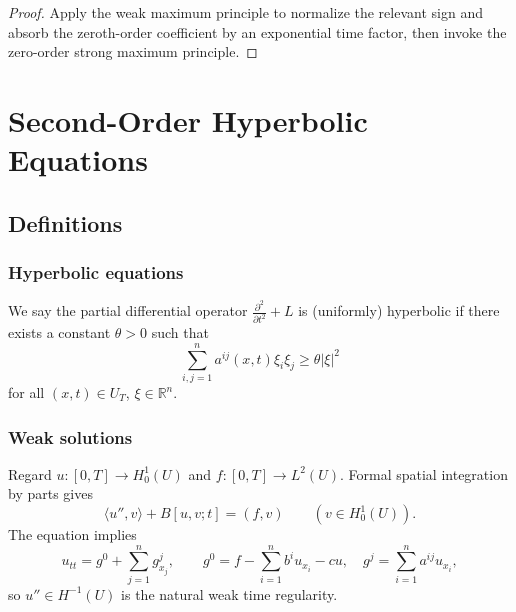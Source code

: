 \begin{proof}
\sketch Apply the weak maximum principle to normalize the relevant sign and absorb the zeroth-order coefficient by an exponential time factor, then invoke the zero-order strong maximum principle.
\end{proof}

\section{Second-Order Hyperbolic Equations}
\label{sec:second-order-hyperbolic-equations}

\subsection{Definitions}

\subsubsection{Hyperbolic equations}

\begin{definition}
\label{def:uniform-hyperbolicity}
We say the partial differential operator $\frac{\partial^2}{\partial t^2} + L$ is (uniformly) hyperbolic if there exists a constant $\theta > 0$ such that
\[
\sum_{i,j=1}^{n} a^{ij}(x,t)\xi_i\xi_j \geq \theta|\xi|^2
\tag{4}
\]
for all $(x,t) \in U_T$, $\xi \in \mathbb{R}^n$.
\end{definition}

\subsubsection{Weak solutions}

\begin{remark}
\label{rem:motivation-weak-solution-hyperbolic}

Regard $u:[0,T]\to H_0^1(U)$ and $f:[0,T]\to L^2(U)$. Formal spatial integration by parts gives
\[
\langle u'',v\rangle+B[u,v;t]=(f,v) \qquad (v\in H_0^1(U)).
\tag{9}
\]
The equation implies
\[
u_{tt}=g^0+\sum_{j=1}^n g^j_{x_j},\qquad
g^0=f-\sum_{i=1}^n b^iu_{x_i}-cu,\quad
g^j=\sum_{i=1}^n a^{ij}u_{x_i},
\]
so $u''\in H^{-1}(U)$ is the natural weak time regularity.
\end{remark}

